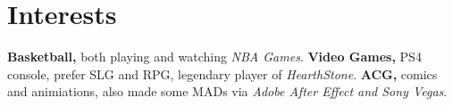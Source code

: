\section{Interests}
\vspace{-0.2cm}
\textbf{Basketball,} both playing and watching \textit{NBA Games}.
\textbf{Video Games,} PS4 console, prefer SLG and RPG,
legendary player of \textit{HearthStone}.
\textbf{ACG,} comics and animiations,
also made some MADs via \textit{Adobe After Effect and Sony Vegas}.
